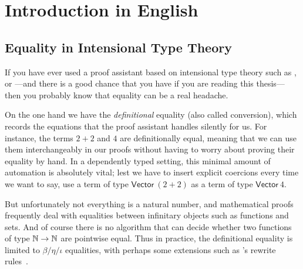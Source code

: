 \setchapterpreamble[u]{\margintoc}
\chapter{Introduction in English}



\section{Equality in Intensional Type Theory}

If you have ever used a proof assistant based on intensional type theory such as
\Coq, \Agda or {\Lean}---and there is a good chance that you have if you are 
reading this thesis---then you probably know that equality can be a real headache.

On the one hand we have the \emph{definitional} equality (also called conversion), which records the 
equations that the proof assistant handles silently for us.
% 
% 
For instance, the terms \( 2+2 \) and \( 4 \) are definitionally equal, meaning that we 
can use them interchangeably in our proofs without having to worry about 
proving their equality by hand.
% 
In a dependently typed setting, this minimal amount of automation is absolutely vital; 
lest we have to insert explicit coercions every time we want to say, use a term 
of type \( \mathsf{Vector}\ (2+2) \) as a term of type \( \mathsf{Vector}\ 4 \).

But unfortunately not everything is a natural 
number, and mathematical proofs
frequently deal with equalities between infinitary objects such as functions and 
sets.
% 
And of course there is no algorithm that can decide whether
two functions of type \( \mathbb{N} \to \mathbb{N} \) are pointwise equal.
% 
Thus in practice, the definitional equality is limited to 
\( \beta / \eta / \iota \) equalities, with perhaps some extensions
such as \Agda's rewrite rules~.

